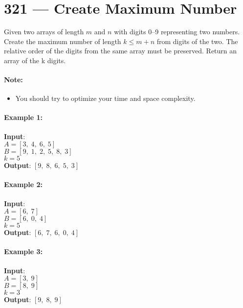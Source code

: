 \section{321 --- Create Maximum Number}
Given two arrays of length $ m $ and $ n $ with digits 0--9 representing two numbers. Create the maximum number of length $ k \leq m + n $ from digits of the two. The relative order of the digits from the same array must be preserved. Return an array of the k digits.

\paragraph{Note:} 
\begin{itemize}
\item You should try to optimize your time and space complexity.
\end{itemize}

\paragraph{Example 1:}

\begin{flushleft}
\textbf{Input}:
\\
$ A  = [3,\;4,\; 6,\; 5]$
\\
$ B  = [9,\; 1,\; 2, \;5,\; 8,\;3]$
\\
$ k = 5 $
\\
\textbf{Output}: $ [9,\; 8,\; 6,\; 5,\; 3] $
\end{flushleft}

\paragraph{Example 2:}

\begin{flushleft}
\textbf{Input}:
\\
$ A = [6,\; 7] $
\\
$ B = [6,\; 0,\; 4] $
\\
$ k = 5 $
\\
\textbf{Output}: $ [6,\; 7, \;6,\; 0,\; 4] $
\end{flushleft}

\paragraph{Example 3:}

\begin{flushleft}
\textbf{Input}:
\\
$ A = [3,\; 9] $
\\
$ B = [8,\; 9] $
\\
$ k = 3 $
\\
\textbf{Output}: $ [9, \;8, \;9] $
\end{flushleft}
